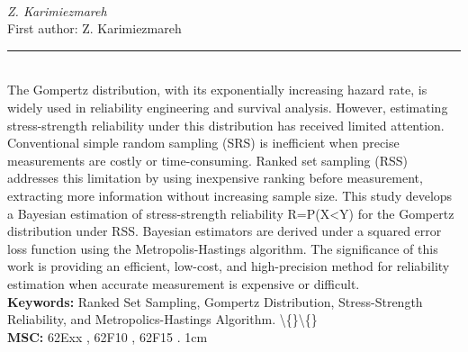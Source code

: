 \documentclass[10pt,twoside]{article}
\begin{document}
\noindent\begin{minipage}[t][\textheight]{\textwidth}
\\[0.35em]
{\itshape Z. Karimiezmareh}\\[0.2em]
{\footnotesize First author: Z. Karimiezmareh}\\[0.45em]
\noindent\rule{\textwidth}{0.3pt}\\[0.4em]
{\footnotesize  The Gompertz distribution, with its exponentially increasing hazard rate, is widely used in reliability engineering and survival analysis. However, estimating stress-strength reliability under this distribution has received limited attention. Conventional simple random sampling (SRS) is inefficient when precise measurements are costly or time-consuming. Ranked set sampling (RSS) addresses this limitation by using inexpensive ranking before measurement, extracting more information without increasing sample size. This study develops a Bayesian estimation of stress-strength reliability R=P(X<Y) for the Gompertz distribution under RSS. Bayesian estimators are derived under a squared error loss function using the Metropolis-Hastings algorithm. The significance of this work is providing an efficient, low-cost, and high-precision method for reliability estimation when accurate measurement is expensive or difficult.}\\[0.4em]
{\footnotesize\bfseries Keywords:} {\footnotesize Ranked Set Sampling, Gompertz Distribution, Stress-Strength Reliability, and Metropolics-Hastings Algorithm. \textbackslash\{\}\textbackslash\{\}}\\[0.15em]
{\footnotesize\bfseries MSC:} {\footnotesize 62Exx , 62F10 , 62F15 . 1cm}\\
\vfill
\end{minipage}
\newpage
\end{document}
